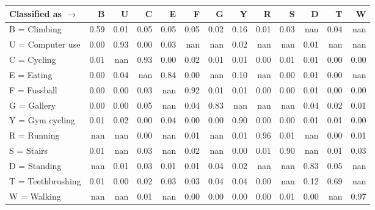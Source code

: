 \begin{tabular}{lrrrrrrrrrrrr}
\toprule
Classified as $\rightarrow$ &    B &    U &    C &    E &    F &    G &    Y &    R &    S &    D &    T &    W \\
\midrule
B = Climbing      & 0.59 & 0.01 & 0.05 & 0.05 & 0.05 & 0.02 & 0.16 & 0.01 & 0.03 &  nan & 0.04 &  nan \\
U = Computer use  & 0.00 & 0.93 & 0.00 & 0.03 &  nan &  nan & 0.02 &  nan &  nan & 0.01 &  nan &  nan \\
C = Cycling       & 0.01 &  nan & 0.93 & 0.00 & 0.02 & 0.01 & 0.01 & 0.00 & 0.01 & 0.01 & 0.00 & 0.00 \\
E = Eating        & 0.00 & 0.04 &  nan & 0.84 & 0.00 &  nan & 0.10 &  nan & 0.00 & 0.01 & 0.00 &  nan \\
F = Fussball      & 0.00 & 0.00 & 0.03 &  nan & 0.92 & 0.01 & 0.01 & 0.00 & 0.00 & 0.01 & 0.00 & 0.00 \\
G = Gallery       & 0.00 & 0.00 & 0.05 &  nan & 0.04 & 0.83 &  nan &  nan &  nan & 0.04 & 0.02 & 0.01 \\
Y = Gym cycling   & 0.01 & 0.02 & 0.00 & 0.04 & 0.00 & 0.00 & 0.90 & 0.00 & 0.00 & 0.01 & 0.01 & 0.00 \\
R = Running       &  nan &  nan & 0.00 &  nan & 0.01 &  nan & 0.01 & 0.96 & 0.01 &  nan & 0.00 & 0.01 \\
S = Stairs        & 0.01 &  nan & 0.03 &  nan & 0.02 &  nan & 0.00 & 0.01 & 0.90 &  nan & 0.01 & 0.03 \\
D = Standing      &  nan & 0.01 & 0.03 & 0.01 & 0.01 & 0.04 & 0.02 &  nan &  nan & 0.83 & 0.05 &  nan \\
T = Teethbrushing & 0.01 & 0.00 & 0.02 & 0.03 & 0.03 & 0.04 & 0.04 & 0.00 &  nan & 0.12 & 0.69 &  nan \\
W = Walking       &  nan &  nan & 0.01 &  nan & 0.00 & 0.00 & 0.00 & 0.00 & 0.01 & 0.00 &  nan & 0.97 \\
\bottomrule
\end{tabular}
